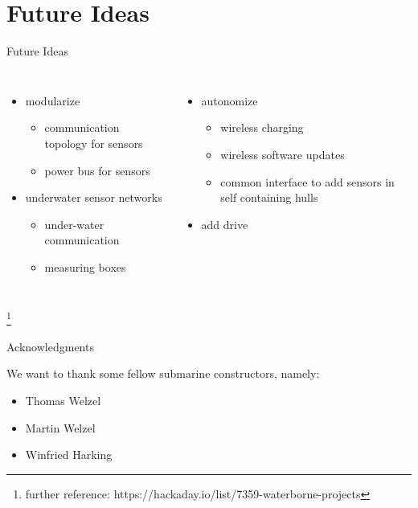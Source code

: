 \documentclass{beamer}
\begin{document}
	\section{Future Ideas}
	\begin{frame}{Future Ideas}
		\begin{columns}
			\begin{itemize}
				\item modularize
					\begin{itemize}
						\item communication topology for sensors
						\item power bus for sensors
					\end{itemize}
				\item underwater sensor networks
					\begin{itemize}
						\item under-water communication
						\item measuring boxes
					\end{itemize}
			\end{itemize}
			\begin{itemize}
				\item autonomize
					\begin{itemize}
						\item wireless charging
						\item wireless software updates
						\item common interface to add sensors in self containing hulls
					\end{itemize}
				\item add drive
			\end{itemize}
		\end{columns}
		\let\thefootnote\relax\footnote{further reference: https://hackaday.io/list/7359-waterborne-projects}
	\end{frame}

	\begin{frame}{Acknowledgments}
		\begin{center}
			We want to thank some fellow submarine constructors, namely:
		\end{center}
		\begin{itemize}
			\item Thomas Welzel
			\item Martin Welzel
			\item Winfried Harking
		\end{itemize}
	\end{frame}
\end{document}
